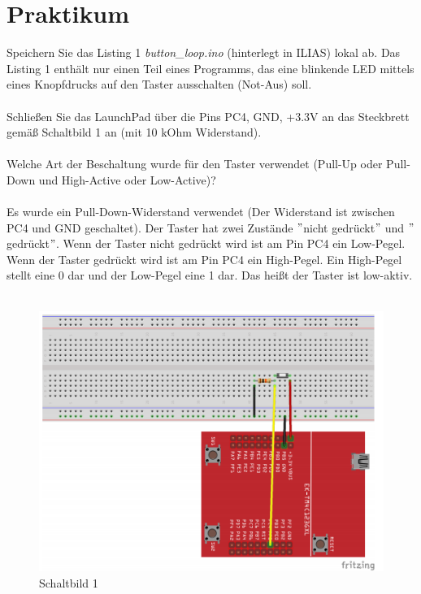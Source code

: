 \section{Praktikum}
Speichern Sie das Listing 1 \textit{button\_loop.ino} (hinterlegt in ILIAS) lokal ab. Das Listing 1 enthält nur einen Teil eines Programms, das eine blinkende LED mittels eines Knopfdrucks auf den Taster ausschalten (Not-Aus) soll.\\ \\
Schlie\ss{}en Sie das LaunchPad über die Pins PC4, GND, +3.3V an das Steckbrett gemä\ss{} Schaltbild 1 an (mit 10 kOhm Widerstand).\\ \\
Welche Art der Beschaltung wurde für den Taster verwendet (Pull-Up oder Pull-Down und
High-Active oder Low-Active)?\\ \\
Es wurde ein Pull-Down-Widerstand verwendet (Der Widerstand ist zwischen PC4 und GND geschaltet). Der Taster hat zwei Zustände $"$nicht gedrückt$"$ und $"$gedrückt$"$. Wenn der Taster nicht gedrückt wird ist am Pin PC4 ein Low-Pegel. Wenn der Taster gedrückt wird ist am Pin PC4 ein High-Pegel. Ein High-Pegel stellt eine 0 dar und der Low-Pegel eine 1 dar. Das hei\ss{}t der Taster ist low-aktiv.\\ \\
\begin{figure}[h]
\centering
\includegraphics[width=0.7\linewidth]{images/Schaltbild1}
\caption{Schaltbild 1}
\label{fig:Schaltbild1}
\end{figure}
\newpage
